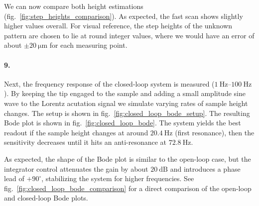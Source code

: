\documentclass[a4paper,twoside,11pt,DIV=13,BCOR=5mm,numbers=noenddot]{scrbook}
\begin{document}
We can now compare both height estimations (fig.~\ref{fig:step_heights_comparison}). As expected, the fast scan shows slightly higher values overall.
For visual reference, the step heights of the unknown pattern are chosen to lie at round integer values, where we would have an error of about $\pm\qty{20}{\micro\m}$ for each measuring point.







\paragraph*{9.}


Next, the frequency response of the closed-loop system is measured ($\qtyrange{1}{100}{\Hz}$).
By keeping the tip engaged to the sample and adding a small amplitude sine wave to the Lorentz acutation signal we simulate varying rates of sample height changes.
The setup is shown in fig.~\ref{fig:closed_loop_bode_setup}.
The resulting Bode plot is shown in fig.~\ref{fig:closed_loop_bode}.
The system yields the best readout if the sample height changes at around $\qty{20.4}{\Hz}$ (first resonance), then the sensitivity decreases until it hits an anti-resonance at $\qty{72.8}{\Hz}$.

As expected, the shape of the Bode plot is similar to the open-loop case, but the integrator control
attenuates the gain by about $\qty{20}{\dB}$ and introduces a phase lead of $+90^{\circ}$, stabilizing the system for higher frequencies.
See fig.~\ref{fig:closed_loop_bode_comparison} for a direct comparison of the open-loop and closed-loop Bode plots.


\end{document}
